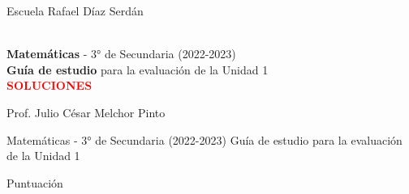 \pagestyle{headandfoot}
\extraheadheight[32mm]{5mm}
\firstpageheader
{}
{\vspace{40mm}
\begin{LARGE} \color{colorrds} Escuela Rafael D\'iaz Serd\'an
\end{LARGE}\LOGO\\
{\large \textbf{Matem\'aticas} - 3° de Secundaria (2022-2023)}\\
\textbf{Guía de estudio} para la evaluación de la Unidad 1\\
{\ifprintanswers
  \textcolor{red}{\textbf{SOLUCIONES}}\\
\fi
}
\begin{footnotesize}Prof. Julio C\'esar Melchor Pinto\end{footnotesize}}
{}
\runningheader
{Matem\'aticas - 3° de Secundaria (2022-2023)}
{}
{Guía de estudio para la evaluación de la Unidad 1}
\runningheadrule
\thispagestyle{headandfoot}
\begin{center}
  
  \footnotesize
  
  \begin{mybox}{0.60\linewidth}{
    \begin{comfortaa}
      \color{white}Puntuaci\'on
    \end{comfortaa}}
    \cellwidth{0.2em}
    \gradetable[h][questions]
  \end{mybox}
\end{center}
